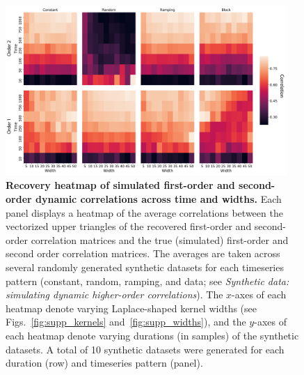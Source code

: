 \documentclass{article}
\begin{document}
\begin{figure}[p!]
\centering
\includegraphics[width=0.95\textwidth]{figs/sim_heatmaps_time}
  \caption{\textbf{Recovery heatmap of simulated first-order and
      second-order dynamic correlations across time and widths.}  Each panel displays a
    heatmap of the average correlations
    between the vectorized upper triangles of the recovered
    first-order and second-order correlation matrices and the true
    (simulated) first-order and second order correlation matrices.
    The averages are taken across several randomly generated
    synthetic datasets for each timeseries pattern (constant, random,
    ramping, and data; see \textit{Synthetic data: simulating dynamic higher-order
      correlations}).  The $x$-axes of each heatmap denote varying
    Laplace-shaped kernel widths (see Figs.~\ref{fig:supp_kernels}
    and~\ref{fig:supp_widths}), and the $y$-axes of each heatmap
    denote varying durations (in samples) of the synthetic datasets.
    A total of 10 synthetic datasets were generated for each duration
    (row) and timeseries pattern (panel).}
\label{fig:time}
\end{figure}
\end{document}

